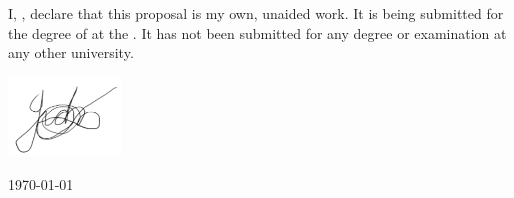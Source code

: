 \documentclass[
12pt, %
oneside, %
english, %
onehalfspacing, %
nolistspacing, %
liststotoc, %
headsepline, %
]{ProposalAndThesis} %
\makeatletter
\newcommand\Cshadowbox{\VerbBox\@Cshadowbox}
\def\@Cshadowbox#1{%
	\setbox\@fancybox\hbox{\fbox{#1}}%
	\leavevmode\vbox{%
		\offinterlineskip
		\dimen@=\shadowsize
		\advance\dimen@ .5\fboxrule
		\hbox{\copy\@fancybox\kern.5\fboxrule\lower\shadowsize\hbox{%
				\color{ShadowColor}\vrule \@height\ht\@fancybox \@depth\dp\@fancybox \@width\dimen@}}%
		\vskip\dimexpr-\dimen@+0.5\fboxrule\relax
		\moveright\shadowsize\vbox{%
			\color{ShadowColor}\hrule \@width\wd\@fancybox \@height\dimen@}}}
\makeatother
\begin{document}
\begin{declaration}
\addchaptertocentry{\authorshipname} %
\vspace{0.5cm}
\noindent I, \authorname, declare that this proposal is my own, unaided work. It is being submitted for the degree of {\degreename} at the \univname. It has not been submitted for any degree or examination at any other university.

\par\vspace{2cm}
\begin{flushright}
\includegraphics[width=30mm]{Figures/sign.png}\par 
\authorname\par\vspace{0.1cm}
\today
\end{flushright}


\end{declaration}
\vfill
\pagebreak





\end{document}
